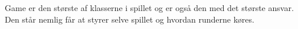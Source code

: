 \documentclass[../../main.tex]{subfiles}
\begin{document}
\begin{flushleft}

Game er den største af klasserne i spillet og er også den med det største ansvar. Den står nemlig får at styrer selve spillet og hvordan runderne køres.
\end{flushleft}
\end{document}
